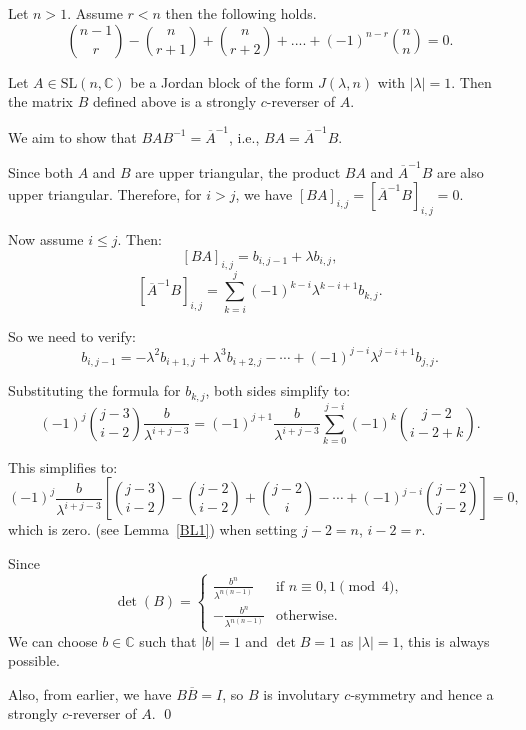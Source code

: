 \documentclass[10pt,a4paper]{amsart}
\renewenvironment{proof}{{\bfseries Proof.}}{\qed}
\begin{document}
	\begin{lemma}\label{BL1} Let $n>1$. Assume $r <n$ then the following holds. 
		$$\binom{n-1}{r}-\binom{n}{r+1}+\binom{n}{r+2}+....+(-1)^{n-r}\binom{n}{n} = 0.$$
		
	\end{lemma}

	\begin{lemma}
Let \( A \in \mathrm{SL}(n,\mathbb{C}) \) be a Jordan block of the form \( J(\lambda,n) \) with \( |\lambda| = 1 \). Then the matrix \( B \) defined above is a strongly \( c \)-reverser of \( A \).
\end{lemma}

\begin{proof}
We aim to show that \( BAB^{-1} = \overline{A}^{-1} \), i.e., \( BA = \overline{A}^{-1}B \).

Since both \( A \) and \( B \) are upper triangular, the product \( BA \) and \( \overline{A}^{-1}B \) are also upper triangular. Therefore, for \( i > j \), we have \( [BA]_{i,j} = [\overline{A}^{-1}B]_{i,j} = 0 \).

Now assume \( i \leq j \). Then:
\[
[BA]_{i,j} = b_{i,j-1} + \lambda b_{i,j},
\]
\[
[\overline{A}^{-1}B]_{i,j} = \sum_{k=i}^j (-1)^{k-i} \lambda^{k-i+1} b_{k,j}.
\]

So we need to verify:
\[
b_{i,j-1} = -\lambda^2 b_{i+1,j} + \lambda^3 b_{i+2,j} - \cdots + (-1)^{j-i} \lambda^{j-i+1} b_{j,j}.
\]

Substituting the formula for \( b_{k,j} \), both sides simplify to:
\[
(-1)^j \binom{j-3}{i-2} \frac{b}{\lambda^{i+j-3}} = 
(-1)^{j+1} \frac{b}{\lambda^{i+j-3}} \sum_{k=0}^{j-i} (-1)^k \binom{j-2}{i-2+k}.
\]

This simplifies to:
\[
(-1)^j \frac{b}{\lambda^{i+j-3}} \left[ \binom{j-3}{i-2} - \binom{j-2}{i-2} + \binom{j-2}{i} - \cdots + (-1)^{j-i} \binom{j-2}{j-2} \right] = 0,
\]
which is zero.  (see Lemma~\ref{BL1}) when setting \( j - 2 = n \), \( i - 2 = r \).

Since
\[
\det(B) = 
\begin{cases}
\displaystyle \frac{b^{n}}{\lambda^{n(n-1)}} & \text{if } n \equiv 0,1 \pmod{4}, \\[8pt]
\displaystyle -\frac{b^{n}}{\lambda^{n(n-1)}} & \text{otherwise}.
\end{cases}
\]
We can choose \( b \in \mathbb{C} \) such that \( |b| = 1 \) and \( \det B = 1 \) as \( |\lambda| = 1 \), this is always possible.

Also, from earlier, we have \( B \overline{B} = I \), so \( B \) is involutary $c$-symmetry and hence a strongly \( c \)-reverser of \( A \).
\end{proof}
\end{document}
